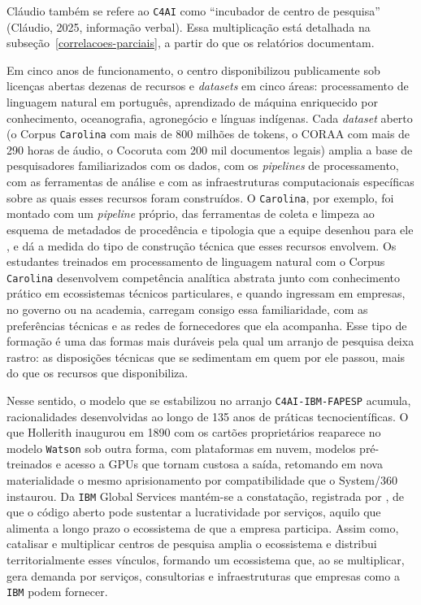 Cláudio também se refere ao \texttt{C4AI} como \enquote{incubador de centro de pesquisa} (Cláudio, 2025, informação verbal). Essa multiplicação está detalhada na subseção~\ref{correlacoes-parciais}, a partir do que os relatórios documentam. %

Em cinco anos de funcionamento, o centro disponibilizou publicamente sob licenças abertas dezenas de recursos e \textit{datasets} em cinco áreas: processamento de linguagem natural em português, aprendizado de máquina enriquecido por conhecimento, oceanografia, agronegócio e línguas indígenas. Cada \textit{dataset} aberto (o Corpus \texttt{Carolina} com mais de 800 milhões de tokens, o CORAA com mais de 290 horas de áudio, o Cocoruta com 200 mil documentos legais) amplia a base de pesquisadores familiarizados com os dados, com os \textit{pipelines} de processamento, com as ferramentas de análise e com as infraestruturas computacionais específicas sobre as quais esses recursos foram construídos. O \texttt{Carolina}, por exemplo, foi montado com um \textit{pipeline} próprio, das ferramentas de coleta e limpeza ao esquema de metadados de procedência e tipologia que a equipe desenhou para ele \parencite{Finger2025BuildingCarolina}, e dá a medida do tipo de construção técnica que esses recursos envolvem. Os estudantes treinados em processamento de linguagem natural com o Corpus \texttt{Carolina} desenvolvem competência analítica abstrata junto com conhecimento prático em ecossistemas técnicos particulares, e quando ingressam em empresas, no governo ou na academia, carregam consigo essa familiaridade, com as preferências técnicas e as redes de fornecedores que ela acompanha. Esse tipo de formação é uma das formas mais duráveis pela qual um arranjo de pesquisa deixa rastro: as disposições técnicas que se sedimentam em quem por ele passou, mais do que os recursos que disponibiliza.

Nesse sentido, o modelo que se estabilizou no arranjo \texttt{C4AI-IBM-FAPESP} acumula, racionalidades desenvolvidas ao longo de 135 anos de práticas tecnocientíficas. O que Hollerith inaugurou em 1890 com os cartões proprietários reaparece no modelo \texttt{Watson} sob outra forma, com plataformas em nuvem, modelos pré-treinados e acesso a GPUs que tornam custosa a saída, retomando em nova materialidade o mesmo aprisionamento por compatibilidade que o System/360 instaurou. Da \texttt{IBM} Global Services mantém-se a constatação, registrada por \textcite{weber2004success}, de que o código aberto pode sustentar a lucratividade por serviços, aquilo que alimenta a longo prazo o ecossistema de que a empresa participa. Assim como, catalisar e multiplicar centros de pesquisa amplia o ecossistema e distribui territorialmente esses vínculos, formando um ecossistema que, ao se multiplicar, gera demanda por serviços, consultorias e infraestruturas que empresas como a \texttt{IBM} podem fornecer.

